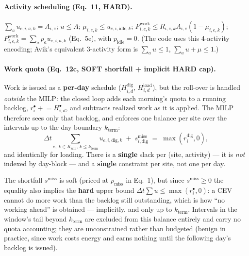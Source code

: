 \documentclass[11pt]{article}
\newcommand{\dt}{\Delta t}
\begin{document}
\paragraph{Activity scheduling (Eq.\ 11, HARD).}
$\sum_a u_{e,i,a,k}=A_{i,e}$; $u\le A$; $\mu_{i,e,k}\le u_{e,i,\text{idle},k}$;
$P^{\text{work}}_{i,e,k}\le R_{i,e,k}A_{i,e}(1-\mu_{i,e,k})$;
$P^{\text{work}}_{i,e,k}=\sum_a p_a u_{e,i,a,k}$ (Eq.\ 5e), with $p_{\text{idle}}=0$.
(The code uses this 4-activity encoding; Avik's equivalent 3-activity form is
$\sum_a u\le1$, $\sum_a u+\mu\le1$.)

\paragraph{Work quota (Eq.\ 12c, SOFT shortfall + implicit HARD cap).}
Work is issued as a \textbf{per-day} schedule ($H^{\text{dig}}_{i,d}$, $H^{\text{load}}_{i,d}$),
but the roll-over is handled \emph{outside} the MILP: the closed loop adds each morning's quota to
a running backlog, $r^{\bullet}_i \mathrel{+}= H^{\bullet}_{i,d}$, and subtracts realized work as it
is applied. The MILP therefore sees only that backlog, and enforces one balance per site over the
intervals up to the day-boundary $k_{\text{term}}$:
\begin{equation}
\dt\!\!\sum_{e,\;k\in K_{\text{win}},\,k\le k_{\text{term}}}\!\!u_{e,i,\text{dig},k}
\;+\;s^{\text{miss}}_{i,\text{dig}}\;=\;\max(r^{\text{dig}}_i,0),
\end{equation}
and identically for loading. There is a \textbf{single} slack per (site, activity) --- it is
\emph{not} indexed by day-block --- and a \textbf{single} constraint per site, not one per day.

The shortfall $s^{\text{miss}}$ is soft (priced at $\rho_{\text{miss}}$ in Eq.~1), but since
$s^{\text{miss}}\ge0$ the equality also implies the \textbf{hard} upper bound
$\dt\sum u\le\max(r^{\bullet}_i,0)$: a CEV cannot do more work than the backlog still outstanding,
which is how ``no working ahead'' is obtained --- implicitly, and only up to $k_{\text{term}}$.
Intervals in the window's tail beyond $k_{\text{term}}$ are excluded from this balance entirely and
carry no quota accounting; they are unconstrained rather than budgeted (benign in practice, since
work costs energy and earns nothing until the following day's backlog is issued).
\end{document}
